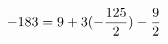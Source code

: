 \documentclass[preview]{standalone}
\begin{document}
\begin{align*}
\special{dvisvgm:raw <g id='unique000'>}-183 = 9 + 3(- \frac{125}{2}) - \frac{9}{2}\special{dvisvgm:raw </g>}
\end{align*}
\end{document}
